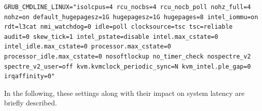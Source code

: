 \documentclass[MMR,Master,english]{style/twbook}
\begin{document}
\vspace{2em}
\begin{lstlisting}[name={Kernel Configurations for Real-Time Performance},label={script:kernel_cli}]
		GRUB_CMDLINE_LINUX="isolcpus=4 rcu_nocbs=4 rcu_nocb_poll nohz_full=4 nohz=on default_hugepagesz=1G hugepagesz=1G hugepages=8 intel_iommu=on rdt=l3cat nmi_watchdog=0 idle=poll clocksource=tsc tsc=reliable audit=0 skew_tick=1 intel_pstate=disable intel.max_cstate=0 intel_idle.max_cstate=0 processor.max_cstate=0 processor_idle.max_cstate=0 nosoftlockup no_timer_check nospectre_v2 spectre_v2_user=off kvm.kvmclock_periodic_sync=N kvm_intel.ple_gap=0 irqaffinity=0"
\end{lstlisting}

\noindent In the following, these settings along with their impact on system latency are briefly described.
\end{document}
